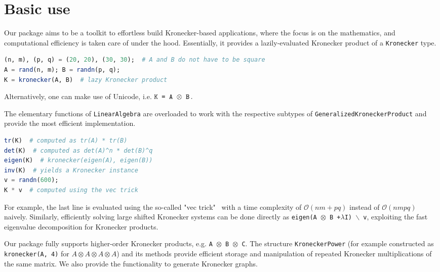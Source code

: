 \documentclass{juliacon}
\begin{document}
\section{Basic use}

Our package aims to be a toolkit to effortless build Kronecker-based applications, where the focus is on the mathematics, and computational efficiency is taken care of under the hood. Essentially, it provides a lazily-evaluated Kronecker product of a \texttt{Kronecker} type.

\begin{lstlisting}[language = Julia]
(n, m), (p, q) = (20, 20), (30, 30);  # A and B do not have to be square
A = rand(n, m); B = randn(p, q);
K = kronecker(A, B)  # lazy Kronecker product
\end{lstlisting}

Alternatively, one can make use of Unicode, i.e.  $\text{\texttt{K = A $\otimes$ B}}\,.$

The elementary functions of \texttt{LinearAlgebra} are overloaded to work with the respective subtypes of \texttt{GeneralizedKroneckerProduct} and provide the most efficient implementation.

\begin{lstlisting}[language = Julia]
tr(K)  # computed as tr(A) * tr(B)
det(K)  # computed as det(A)^n * det(B)^q
eigen(K)  # kronecker(eigen(A), eigen(B))
inv(K)  # yields a Kronecker instance
v = randn(600);
K * v  # computed using the vec trick
\end{lstlisting}

For example, the last line is evaluated using the so-called "vec trick"~\cite{VanLoan2000} with a time complexity of $\mathcal{O}(nm+pq)$ instead of $\mathcal{O}(nmpq)$ naively.
Similarly, efficiently solving large shifted Kronecker systems can be done directly as \texttt{eigen(A $\otimes$ B +$\lambda$I) $\backslash$ v}, exploiting the fast eigenvalue decomposition for Kronecker products.

Our package fully supports higher-order Kronecker products, e.g. \texttt{A $\otimes$ B $\otimes$ C}.
The structure \texttt{KroneckerPower} (for example constructed as \texttt{kronecker(A, 4)} for $A \otimes A \otimes A \otimes A$) and its methods provide efficient storage and manipulation of repeated Kronecker multiplications of the same matrix. We also provide the functionality to generate Kronecker graphs.
\end{document}
